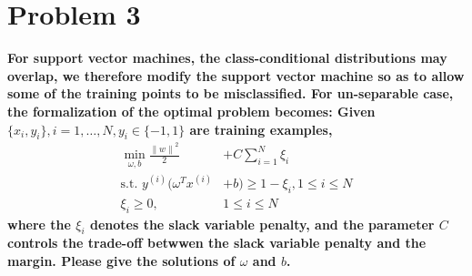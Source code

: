 \documentclass[paper=a4, fontsize=11pt]{scrartcl} %
\numberwithin{equation}{section} %
\numberwithin{figure}{section} %
\numberwithin{table}{section} %
\begin{document}
\section{Problem 3}
\textbf{For support vector machines, the class-conditional distributions may overlap, we therefore modify the support vector machine so as to allow some of the training points to be misclassified. For un-separable case, the formalization of the optimal problem becomes: Given $\{x_i, y_i\}, i=1, \dots, N, y_i \in \{−1, 1\}$ are training examples,}
\[
\begin{split}
  \displaystyle\min_{\omega, b} \frac{{\|w\|}^2}{2} & + C \displaystyle \sum_{i=1}^{N} \xi_i\\
  \mbox{s.t. } y^{(i)}(\omega^T x^{(i)} & + b) \geq 1 - \xi_i, 1 \leq i \leq N \\
  \xi_i \geq 0, & 1 \leq i \leq N
  \end{split}
\]
\textbf{where the $\xi_i$ denotes the slack variable penalty, and the parameter $C$ controls the trade-off betwwen the slack variable penalty and the margin. Please give the solutions of $\omega$ and $b$.}
\end{document}

